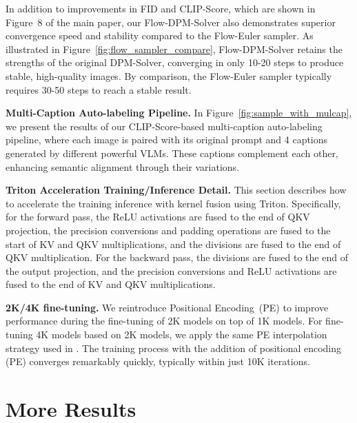 In addition to improvements in FID and CLIP-Score, which are shown in Figure~8 of the main paper, our Flow-DPM-Solver also demonstrates superior convergence speed and stability compared to the Flow-Euler sampler. As illustrated in Figure~\ref{fig:flow_sampler_compare}, Flow-DPM-Solver retains the strengths of the original DPM-Solver, converging in only 10-20 steps to produce stable, high-quality images. By comparison, the Flow-Euler sampler typically requires 30-50 steps to reach a stable result.











\noindent \textbf{Multi-Caption Auto-labeling Pipeline.}
In Figure~\ref{fig:sample_with_mulcap}, we present the results of our CLIP-Score-based multi-caption auto-labeling pipeline, where each image is paired with its original prompt and 4 captions generated by different powerful VLMs. These captions complement each other, enhancing semantic alignment through their variations.


\noindent \textbf{Triton Acceleration Training/Inference Detail.}
This section describes how to accelerate the training inference with kernel fusion using Triton.
Specifically, for the forward pass, the ReLU activations are fused to the end of QKV projection, the precision conversions and padding operations are fused to the start of KV and QKV multiplications, and the divisions are fused to the end of QKV multiplication. For the backward pass, the divisions are fused to the end of the output projection, and the precision conversions and ReLU activations are fused to the end of KV and QKV multiplications.

\noindent \textbf{2K/4K fine-tuning.}
We reintroduce Positional Encoding~(PE) to improve performance during the fine-tuning of 2K models on top of 1K models. For fine-tuning 4K models based on 2K models, we apply the same PE interpolation strategy used in \cite{chen2024pixart}. The training process with the addition of positional encoding (PE) converges remarkably quickly, typically within just 10K iterations.



\section{More Results}

